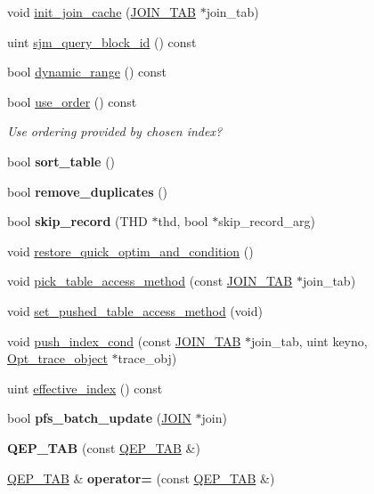 \begin{DoxyCompactItemize}
void \mbox{\hyperlink{group__Query__Optimizer_ga44c5164eb9405b18a16ca8a3ee339047}{init\+\_\+join\+\_\+cache}} (\mbox{\hyperlink{classJOIN__TAB}{J\+O\+I\+N\+\_\+\+T\+AB}} $\ast$join\+\_\+tab)
\item 
uint \mbox{\hyperlink{group__Query__Optimizer_gac2c4cb376fec34447cf5df2b3d4c238a}{sjm\+\_\+query\+\_\+block\+\_\+id}} () const
\item 
bool \mbox{\hyperlink{classQEP__TAB_a2174fd8941cd639176550b49e8ebc4fd}{dynamic\+\_\+range}} () const
\item 
bool \mbox{\hyperlink{group__Query__Executor_ga685838679adf501ece418d4bd969f2ea}{use\+\_\+order}} () const
\begin{DoxyCompactList}\small\item\em Use ordering provided by chosen index? \end{DoxyCompactList}\item 
bool {\bfseries sort\+\_\+table} ()
\item 
bool {\bfseries remove\+\_\+duplicates} ()
\item 
\mbox{\label{classQEP__TAB_aa70ebd94f1596c6b857a4ef72e070d95}} 
bool {\bfseries skip\+\_\+record} (T\+HD $\ast$thd, bool $\ast$skip\+\_\+record\+\_\+arg)
\item 
void \mbox{\hyperlink{classQEP__TAB_aafe7ee2f566e71ae543241e061d5cbe2}{restore\+\_\+quick\+\_\+optim\+\_\+and\+\_\+condition}} ()
\item 
void \mbox{\hyperlink{group__Query__Executor_gaf6ecbbe7a1950c60e06170bce55ff70e}{pick\+\_\+table\+\_\+access\+\_\+method}} (const \mbox{\hyperlink{classJOIN__TAB}{J\+O\+I\+N\+\_\+\+T\+AB}} $\ast$join\+\_\+tab)
\item 
void \mbox{\hyperlink{group__Query__Executor_gae69d0ee5d7d438abeff1d7d4c99abd8f}{set\+\_\+pushed\+\_\+table\+\_\+access\+\_\+method}} (void)
\item 
void \mbox{\hyperlink{group__Query__Optimizer_ga5ededf725731bb0cfd5a3871181f496e}{push\+\_\+index\+\_\+cond}} (const \mbox{\hyperlink{classJOIN__TAB}{J\+O\+I\+N\+\_\+\+T\+AB}} $\ast$join\+\_\+tab, uint keyno, \mbox{\hyperlink{classOpt__trace__object}{Opt\+\_\+trace\+\_\+object}} $\ast$trace\+\_\+obj)
\item 
uint \mbox{\hyperlink{group__Query__Optimizer_gada415e1d087c014e9b8a22b39980bfea}{effective\+\_\+index}} () const
\item 
bool {\bfseries pfs\+\_\+batch\+\_\+update} (\mbox{\hyperlink{classJOIN}{J\+O\+IN}} $\ast$join)
\item 
\mbox{\label{classQEP__TAB_af381c4f385c4d9c4bf2f8165047114b8}} 
{\bfseries Q\+E\+P\+\_\+\+T\+AB} (const \mbox{\hyperlink{classQEP__TAB}{Q\+E\+P\+\_\+\+T\+AB}} \&)
\item 
\mbox{\label{classQEP__TAB_aed12d50fa09c8050321718b360ea7770}} 
\mbox{\hyperlink{classQEP__TAB}{Q\+E\+P\+\_\+\+T\+AB}} \& {\bfseries operator=} (const \mbox{\hyperlink{classQEP__TAB}{Q\+E\+P\+\_\+\+T\+AB}} \&)
\end{DoxyCompactItemize}

